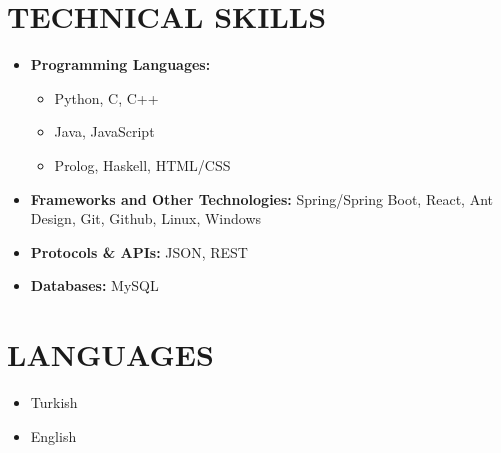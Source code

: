 \begin{minipage}[t]{0.73\textwidth}
  \section{TECHNICAL SKILLS}
    \begin{multicols}{2}
      \begin{itemize}[leftmargin=0.25in, itemsep=1pt]
        \item \textbf{Programming Languages:} 
          \begin{itemize}[label={-}, leftmargin=0.2in]
            \item Python, C, C++
            \item Java, JavaScript
            \item Prolog, Haskell, HTML/CSS
          \end{itemize}
        \vspace{\fill}

        \item \textbf{Frameworks and Other Technologies:} 
          Spring/Spring Boot, React, Ant Design, Git, Github, Linux, Windows
        
        \item \textbf{Protocols \& APIs:} 
          JSON, REST

        \item \textbf{Databases:} 
          MySQL
      \end{itemize}
    \end{multicols}
\end{minipage}
\hspace{\fill}
\begin{minipage}[t]{0.22\textwidth}
  \section{LANGUAGES}
    \begin{itemize}[leftmargin=0.25in, itemsep=1pt]
      \item Turkish
      \item English
    \end{itemize}
\end{minipage}
